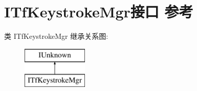 \hypertarget{interface_i_tf_keystroke_mgr}{}\section{I\+Tf\+Keystroke\+Mgr接口 参考}
\label{interface_i_tf_keystroke_mgr}
类 I\+Tf\+Keystroke\+Mgr 继承关系图\+:\begin{figure}[H]
\begin{center}
\leavevmode
\includegraphics[height=2.000000cm]{interface_i_tf_keystroke_mgr}
\end{center}
\end{figure}
